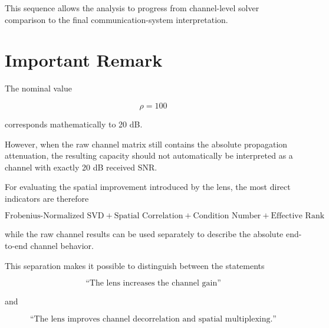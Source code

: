 \documentclass[11pt,a4paper]{article}
\begin{document}
This sequence allows the analysis to progress from channel-level solver comparison to the final communication-system interpretation.

\section{Important Remark}

The nominal value

\[
\rho=100
\]

corresponds mathematically to 20 dB.

However, when the raw channel matrix still contains the absolute propagation attenuation, the resulting capacity should not automatically be interpreted as a channel with exactly 20 dB received SNR.

For evaluating the spatial improvement introduced by the lens, the most direct indicators are therefore

\[
\boxed{
\text{Frobenius-Normalized SVD}
+
\text{Spatial Correlation}
+
\text{Condition Number}
+
\text{Effective Rank}
}
\]

while the raw channel results can be used separately to describe the absolute end-to-end channel behavior.

This separation makes it possible to distinguish between the statements

\[
\text{``The lens increases the channel gain''}
\]

and

\[
\text{``The lens improves channel decorrelation and spatial multiplexing.''}
\]
\end{document}

